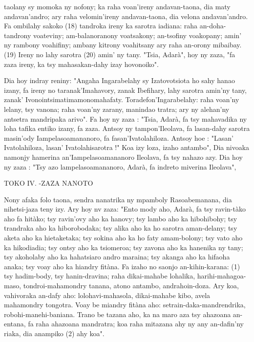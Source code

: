 taolany sy momoka ny nofony; ka raha voan'ireny andavan-taona, dia
maty andavan'andro; ary raha velomin'ireny andavan-taona, dia velona
andavan'andro. Fa ombilahy sakoko (18) tandroka ireny ka sarotra iadiana:
raha an-doha-tandrony voateviny; am-balanoranony voatsakony; an-tsofiny
voakopany; amin' ny rambony voahifiny; ambany kitrony voahitsany
ary raha an-orony mibaibay. (19) Ireny no lahy sarotra (20) amin' ny tany.
"Tsia, Adarà", hoy ny zaza, "fa zaza ireny, ka tsy mahasakan-dahy izay
hovonoiko".

Dia hoy indray reniny: "Angaha Ingarabelahy sy Izatovotsiota ho sahy hanao izany,
fa ireny no taranak'Imahavory, zanak Ibefihary, lahy sarotra amin'ny tany,
zanak' Ivonointsimatimamonomahafaty. Toradefon'Ingarabelahy: raha voan'ny lelany,
tsy vanona; raha voan'ny zarany, manindao tratra; ary ny alehan'ny antsetra mandripaka arivo".
Fa hoy ny zaza : "Tsia, Adarà, fa tsy mahavadika ny loha tafika entiko izany,
fa zaza. Antsoy ny tampon'Ileolava, fa lasan-dahy sarotra masin'ody
Iampelasoamananoro, fa fasan'Ivatolahiloza. Antsoy hoe : "Lasan' Ivatolahiloza, lasan' Ivatolahisarotra !"
Koa izy loza, izaho antambo", Dia nivoaka namonjy hamerina an'Iampelasoamananoro Ileolava, fa tsy nahazo
azy. Dia hoy ny zaza : "Tsy azo lampelasoamananoro, Adarà, fa indreto miverina Ileolava",



TOKO IV. -ZAZA NANOTO

Nony afaka folo taona, sendra nanatrika ny mpamboly Rasoabemanana,
dia nihetsi-jaza teny izy. Ary hoy nv zaza: "Ento mody aho, Adarà, fa tsy
ravin-tàko aho fa hitàko; tsy ravin'ovy aho ka hanovy; tsy lambo aho
ka hibohibohy; tsy trandraka aho ka hiborobodaka; tsy alika aho ka ho
sarotra aman-delany; tsy aketa aho ka hietaketaka; tsy sokina aho ka ho
faty amam-bolony; tsy vato aho ka hikodiadia; tsy ontsy aho ka tsiomeroa;
tsy zavona aho ka hanenika ny tany; tsy akoholaby aho ka hahatsiaro andro
maraina; tsy akanga aho ka hifaoha anaka; tsy voay aho ka hiandry fitàna.
Fa izaho no saonjo an-kihin-karana: (1) tsy hadim-body, tsy hanin-dravina;
raha dikai-mahabe lohalika, harihi-mahagoa-maso, tondroi-mahamondry
tanana, atono antambo, andrahoin-doza. Ary koa, vahivoraka an-dafy aho:
lolohavi-mahasola, dikai-mahabe kibo, avela mahamondry tongotra. Voay
be miandry fitàna aho: setrain-daka-mandrendrika, robohi-manehi-baniana.
Trano be tazana aho, ka na maro aza tsy ahazoana an-entana, fa
raha ahazoana mandratra; koa raha mitazana ahy ny any an-dafin'ny
riaka, dia anampiko (2) ahy koa".

